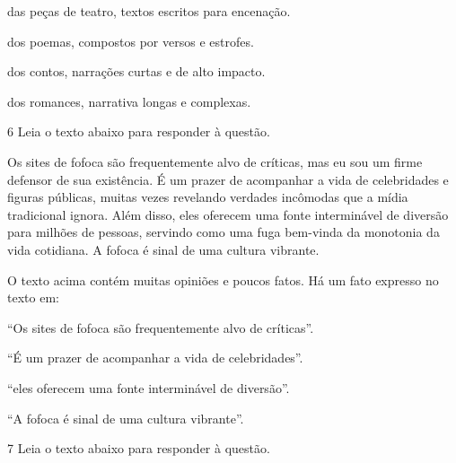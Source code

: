 \begin{escolha}

  \item das peças de teatro, textos escritos para encenação.

  \item dos poemas, compostos por versos e estrofes.

  \item dos contos, narrações curtas e de alto impacto.

  \item dos romances, narrativa longas e complexas.

\end{escolha}

\num{6} Leia o texto abaixo para responder à questão. 

\begin{myquote}

Os sites de fofoca são frequentemente alvo de críticas, mas eu sou
um firme defensor de sua existência. É um prazer de acompanhar a vida de celebridades
e figuras públicas, muitas vezes revelando verdades incômodas que a mídia tradicional 
ignora. Além disso, eles oferecem uma fonte interminável de diversão para milhões de
pessoas, servindo como uma fuga bem-vinda da monotonia da vida cotidiana. A
fofoca é sinal de uma cultura vibrante.


\end{myquote}

O texto acima contém muitas opiniões e poucos fatos. Há um fato
expresso no texto em:

\begin{escolha}

  \item ``Os sites de fofoca são frequentemente alvo de críticas''.
  
  \item ``É um prazer de acompanhar a vida de celebridades''.
  
  \item ``eles oferecem uma fonte interminável de diversão''.
  
  \item ``A fofoca é sinal de uma cultura vibrante''.

\end{escolha}

\num{7} Leia o texto abaixo para responder à questão.

